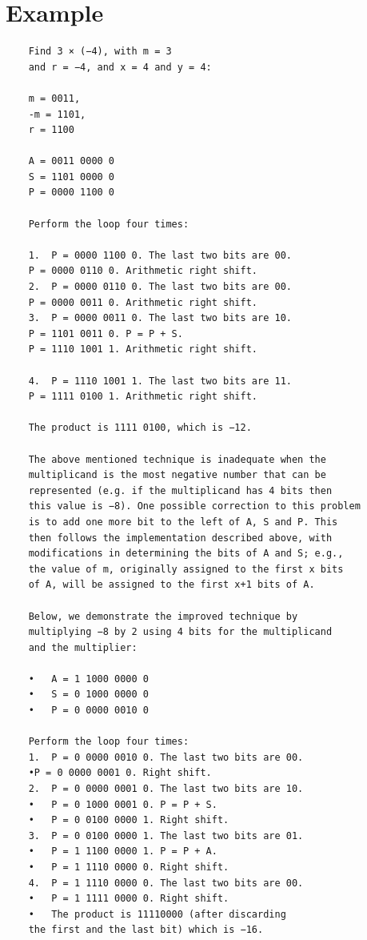 \documentclass[a4paper,12pt]{article}
\begin{document}
\section{Example}
\lstset{}
\begin{lstlisting}
	Find 3 × (−4), with m = 3 
	and r = −4, and x = 4 and y = 4:     
	
	m = 0011, 
	-m = 1101,
	r = 1100
	
	A = 0011 0000 0 
	S = 1101 0000 0 
	P = 0000 1100 0 
	
	Perform the loop four times: 
	
	1.	P = 0000 1100 0. The last two bits are 00.  
	P = 0000 0110 0. Arithmetic right shift.  
	2.	P = 0000 0110 0. The last two bits are 00.  
	P = 0000 0011 0. Arithmetic right shift.  
	3.	P = 0000 0011 0. The last two bits are 10. 
	P = 1101 0011 0. P = P + S.  
	P = 1110 1001 1. Arithmetic right shift.  
	
	4.	P = 1110 1001 1. The last two bits are 11. 
	P = 1111 0100 1. Arithmetic right shift.  
	
	The product is 1111 0100, which is −12. 
	
	The above mentioned technique is inadequate when the
	multiplicand is the most negative number that can be 
	represented (e.g. if the multiplicand has 4 bits then
	this value is −8). One possible correction to this problem
	is to add one more bit to the left of A, S and P. This
	then follows the implementation described above, with 
	modifications in determining the bits of A and S; e.g., 
	the value of m, originally assigned to the first x bits 
	of A, will be assigned to the first x+1 bits of A. 
	
	Below, we demonstrate the improved technique by
	multiplying −8 by 2 using 4 bits for the multiplicand
	and the multiplier: 
	
	•	A = 1 1000 0000 0  
	•	S = 0 1000 0000 0  
	•	P = 0 0000 0010 0  
	
	Perform the loop four times: 
	1.	P = 0 0000 0010 0. The last two bits are 00.
	•P = 0 0000 0001 0. Right shift.  
	2.	P = 0 0000 0001 0. The last two bits are 10.  
	•	P = 0 1000 0001 0. P = P + S.  
	•	P = 0 0100 0000 1. Right shift.  
	3.	P = 0 0100 0000 1. The last two bits are 01.  
	•	P = 1 1100 0000 1. P = P + A.  
	•	P = 1 1110 0000 0. Right shift.  
	4.	P = 1 1110 0000 0. The last two bits are 00.  
	•	P = 1 1111 0000 0. Right shift.  
	•	The product is 11110000 (after discarding 
	the first and the last bit) which is −16.  
	
\end{lstlisting}
\end{document}
